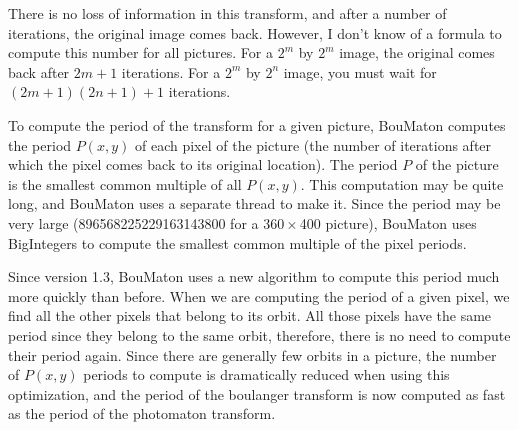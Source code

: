 \documentclass[a4paper]{article}
\newcommand{\BouMaton}{\textsf{BouMaton}\xspace}
\newcommand{\picdim}[2]{#1\,\(\times\)\,#2}
\begin{document}
  There is no loss of information in this transform, and after a
  number of iterations, the original image comes back. However, I
  don't know of a formula to compute this number for all pictures. For
  a \(2^m\) by \(2^m\) image, the original comes back after \(2m+1\)
  iterations. For a \(2^m\) by \(2^n\) image, you must wait for
  \((2m+1)(2n+1)+1\) iterations.

  To compute the period of the transform for a given
  picture, \BouMaton computes the period \(P(x,y)\) of each pixel
  of the picture (the number of iterations after which the pixel comes
  back to its original location).  The period \(P\) of the picture is the
  smallest common multiple of all \(P(x,y)\).  This computation may
  be quite long, and \BouMaton uses a separate thread to make it. 
  Since the period may be very large (896568225229163143800 for a 
  \picdim{360}{400} picture), \BouMaton uses BigIntegers to compute 
  the smallest common multiple of the pixel periods.
  
  Since version 1.3, \BouMaton uses a new algorithm to compute this 
  period much more quickly than before. When we are computing the 
  period of a given pixel, we find all the other pixels that belong to 
  its orbit. All those pixels have the same period since they belong 
  to the same orbit, therefore, there is no need to compute their 
  period again. Since there are generally few orbits in a picture, 
  the number of \(P(x,y)\) periods to compute is dramatically reduced 
  when using this optimization, and the period of the boulanger 
  transform is now computed as fast as the period of the photomaton 
  transform.
  
\end{document}
